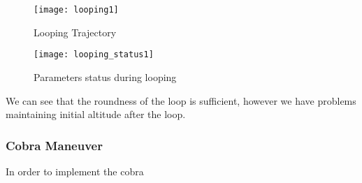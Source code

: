 \begin{figure}[H]
    \centering
    \texttt{[image: looping1]}
        \caption{Looping Trajectory}
        \label{fig:looping}
\end{figure}
\begin{figure}[H]
    \centering
    \texttt{[image: looping\_status1]}
    \caption{Parameters status during looping}
    \label{fig:looping_status}
\end{figure}

We can see that the roundness of the loop is sufficient, however we have
problems maintaining initial altitude after the loop.

\subsubsection{Cobra Maneuver}
In order to implement the cobra 

